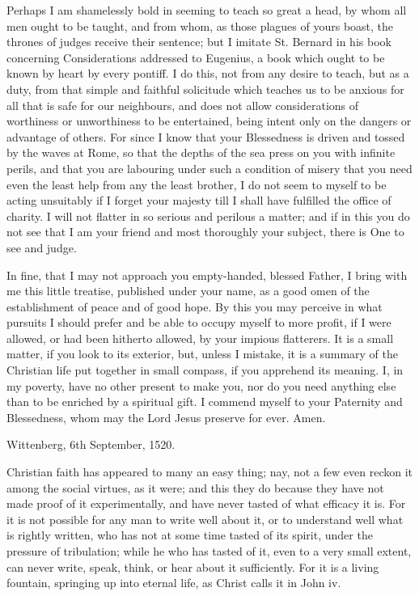 Perhaps I am shamelessly bold in seeming to teach so great a head, by whom
all men ought to be taught, and from whom, as those plagues of yours
boast, the thrones of judges receive their sentence; but I imitate St.
Bernard in his book concerning Considerations addressed to Eugenius, a
book which ought to be known by heart by every pontiff. I do this, not
from any desire to teach, but as a duty, from that simple and faithful
solicitude which teaches us to be anxious for all that is safe for our
neighbours, and does not allow considerations of worthiness or
unworthiness to be entertained, being intent only on the dangers or
advantage of others. For since I know that your Blessedness is driven and
tossed by the waves at Rome, so that the depths of the sea press on you
with infinite perils, and that you are labouring under such a condition of
misery that you need even the least help from any the least brother, I do
not seem to myself to be acting unsuitably if I forget your majesty till I
shall have fulfilled the office of charity. I will not flatter in so
serious and perilous a matter; and if in this you do not see that I am
your friend and most thoroughly your subject, there is One to see and
judge.

In fine, that I may not approach you empty-handed, blessed Father, I bring
with me this little treatise, published under your name, as a good omen of
the establishment of peace and of good hope. By this you may perceive in
what pursuits I should prefer and be able to occupy myself to more profit,
if I were allowed, or had been hitherto allowed, by your impious
flatterers. It is a small matter, if you look to its exterior, but, unless
I mistake, it is a summary of the Christian life put together in small
compass, if you apprehend its meaning. I, in my poverty, have no other
present to make you, nor do you need anything else than to be enriched by
a spiritual gift. I commend myself to your Paternity and Blessedness, whom
may the Lord Jesus preserve for ever. Amen.

Wittenberg, 6th September, 1520.


Christian faith has appeared to many an easy thing; nay, not a few even
reckon it among the social virtues, as it were; and this they do because
they have not made proof of it experimentally, and have never tasted of
what efficacy it is. For it is not possible for any man to write well
about it, or to understand well what is rightly written, who has not at
some time tasted of its spirit, under the pressure of tribulation; while
he who has tasted of it, even to a very small extent, can never write,
speak, think, or hear about it sufficiently. For it is a living fountain,
springing up into eternal life, as Christ calls it in John iv.


